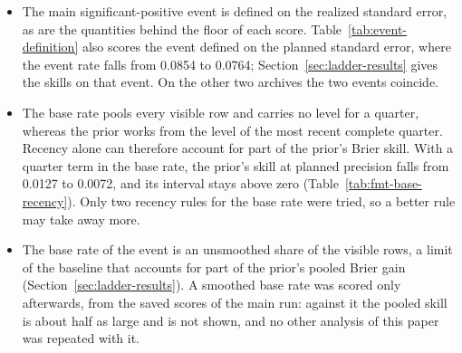 \begin{itemize}
\item The main significant-positive event is defined on the realized standard error, as are the quantities behind the floor of each score. Table~\ref{tab:event-definition} also scores the event defined on the planned standard error, where the event rate falls from 0.0854 to 0.0764; Section~\ref{sec:ladder-results} gives the skills on that event. On the other two archives the two events coincide.
\item The base rate pools every visible row and carries no level for a quarter, whereas the prior works from the level of the most recent complete quarter. Recency alone can therefore account for part of the prior's Brier skill. With a quarter term in the base rate, the prior's skill at planned precision falls from 0.0127 to 0.0072, and its interval stays above zero (Table~\ref{tab:fmt-base-recency}). Only two recency rules for the base rate were tried, so a better rule may take away more.
\item The base rate of the event is an unsmoothed share of the visible rows, a limit of the baseline that accounts for part of the prior's pooled Brier gain (Section~\ref{sec:ladder-results}). A smoothed base rate was scored only afterwards, from the saved scores of the main run: against it the pooled skill is about half as large and is not shown, and no other analysis of this paper was repeated with it.

\end{itemize}
